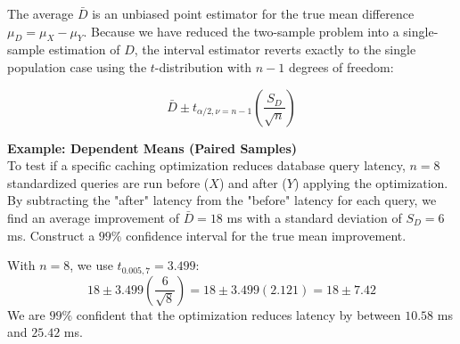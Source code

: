 \documentclass{article}
\begin{document}
The average $\bar{D}$ is an unbiased point estimator for the true mean difference $\mu_D = \mu_X - \mu_Y$. Because we have reduced the two-sample problem into a single-sample estimation of $D$, the interval estimator reverts exactly to the single population case using the $t$-distribution with $n-1$ degrees of freedom:

$$ \bar{D} \pm t_{\alpha/2, \nu = n - 1} \left( \frac{S_D}{\sqrt{n}} \right) $$

\textbf{Example: Dependent Means (Paired Samples)} \\
To test if a specific caching optimization reduces database query latency, $n=8$ standardized queries are run before ($X$) and after ($Y$) applying the optimization. By subtracting the "after" latency from the "before" latency for each query, we find an average improvement of $\bar{D} = 18$ ms with a standard deviation of $S_D = 6$ ms. Construct a $99\%$ confidence interval for the true mean improvement. 

With $n=8$, we use $t_{0.005, 7} = 3.499$:
$$ 18 \pm 3.499 \left( \frac{6}{\sqrt{8}} \right) = 18 \pm 3.499(2.121) = 18 \pm 7.42 $$
We are $99\%$ confident that the optimization reduces latency by between $10.58$ ms and $25.42$ ms.
\end{document}
